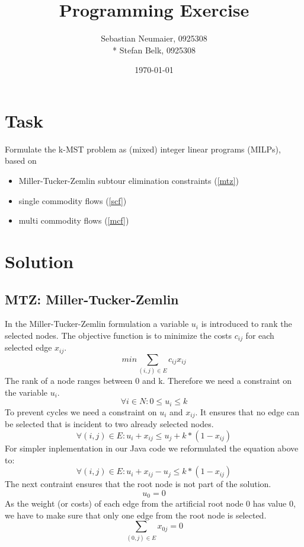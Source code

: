 \documentclass{article}
\title{Programming Exercise}
\author{Sebastian Neumaier, 0925308 \\* Stefan Belk, 0925308}
\date{\today}
\begin{document}
\maketitle

\section{Task}

Formulate the k-MST problem as (mixed) integer linear programs (MILPs), based on
\begin{itemize}
\item Miller-Tucker-Zemlin subtour elimination constraints (\ref{mtz})
\item single commodity flows (\ref{scf})
\item multi commodity flows (\ref{mcf})
\end{itemize}
\section{Solution}

\subsection{MTZ: Miller-Tucker-Zemlin \label{mtz}}
In the Miller-Tucker-Zemlin formulation a variable $u_i$ is introduced to rank the selected nodes. The objective function is to minimize the costs $c_{ij}$ for each selected edge $x_{ij}$.
\setcounter{equation}{0}
\begin{equation}
min \sum_{(i,j) \in E} c_{ij} x_{ij}
\end{equation}
The rank of a node ranges between 0 and k. Therefore we need a constraint on the variable $u_i$.
\begin{equation}
\forall i \in N : 0 \le u_i \le k
\end{equation}
To prevent cycles we need a constraint on $u_i$ and $x_{ij}$. It ensures that no edge can be selected that is incident to two already selected nodes.
\begin{equation}
\forall (i,j) \in E : u_i + x_{ij} \le u_j + k * ( 1 - x_{ij})
\end{equation}
For simpler inplementation in our Java code we reformulated the equation above to:
\begin{equation}
\forall (i,j) \in E : u_i + x_{ij} - u_j \le k * ( 1 - x_{ij})
\end{equation}
The next contraint ensures that the root node is not part of the solution.
\begin{equation}
u_0 = 0
\end{equation}
As the weight (or costs) of each edge from the artificial root node 0 has value 0, we have to make sure that only one edge from the root node is selected.
\begin{equation}
\sum_{(0,j) \in E} x_{0j} = 0
\end{equation}
\end{document}
